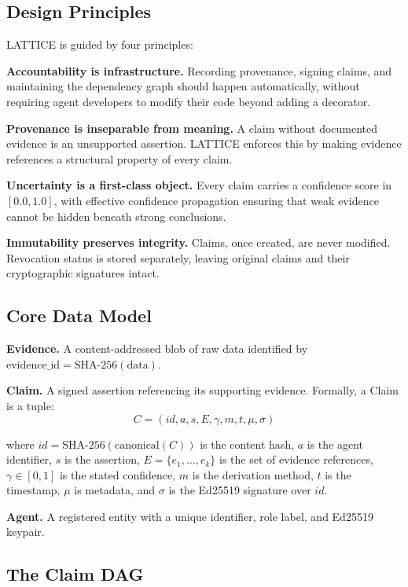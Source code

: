 \documentclass[11pt,twocolumn]{article}
\begin{document}
\subsection{Design Principles}

LATTICE is guided by four principles:

\textbf{Accountability is infrastructure.} Recording provenance, signing claims, and maintaining the dependency graph should happen automatically, without requiring agent developers to modify their code beyond adding a decorator.

\textbf{Provenance is inseparable from meaning.} A claim without documented evidence is an unsupported assertion. LATTICE enforces this by making evidence references a structural property of every claim.

\textbf{Uncertainty is a first-class object.} Every claim carries a confidence score in $[0.0, 1.0]$, with effective confidence propagation ensuring that weak evidence cannot be hidden beneath strong conclusions.

\textbf{Immutability preserves integrity.} Claims, once created, are never modified. Revocation status is stored separately, leaving original claims and their cryptographic signatures intact.

\subsection{Core Data Model}

\textbf{Evidence.} A content-addressed blob of raw data identified by $\text{evidence\_id} = \text{SHA-256}(\text{data})$.

\textbf{Claim.} A signed assertion referencing its supporting evidence. Formally, a Claim is a tuple:
\[
C = (id, a, s, E, \gamma, m, t, \mu, \sigma)
\]

\noindent where $id = \text{SHA-256}(\text{canonical}(C))$ is the content hash, $a$ is the agent identifier, $s$ is the assertion, $E = \{e_1, \ldots, e_k\}$ is the set of evidence references, $\gamma \in [0,1]$ is the stated confidence, $m$ is the derivation method, $t$ is the timestamp, $\mu$ is metadata, and $\sigma$ is the Ed25519 signature over $id$.

\textbf{Agent.} A registered entity with a unique identifier, role label, and Ed25519 keypair.

\subsection{The Claim DAG}
\end{document}
